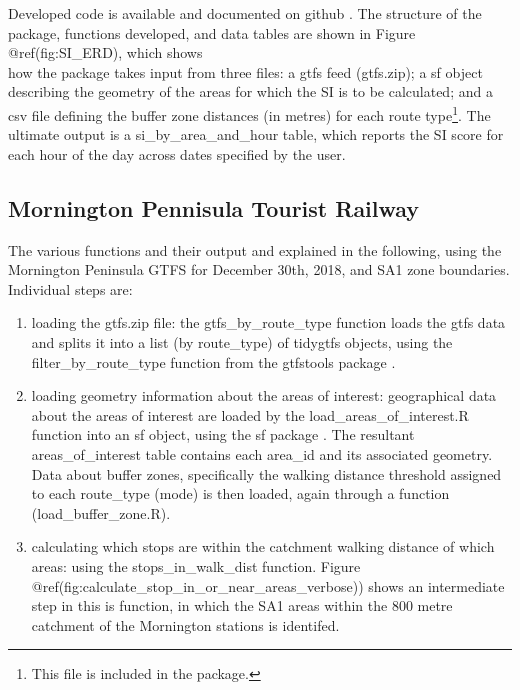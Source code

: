 \documentclass[preprint, 3p,
authoryear]{elsarticle} %
\begin{document}
Developed code is available and documented on github
\citep{gtfssupplyindex_github}. The structure of the package, functions
developed, and data tables are shown in Figure @ref(fig:SI\_ERD), which
shows\\
how the package takes input from three files: a gtfs feed (gtfs.zip); a
sf object describing the geometry of the areas for which the SI is to be
calculated; and a csv file defining the buffer zone distances (in
metres) for each route type\footnote{This file is included in the
  package.}. The ultimate output is a si\_by\_area\_and\_hour table,
which reports the SI score for each hour of the day across dates
specified by the user.

\hypertarget{mornington-pennisula-tourist-railway}{%
\subsection{Mornington Pennisula Tourist
Railway}\label{mornington-pennisula-tourist-railway}}

The various functions and their output and explained in the following,
using the Mornington Peninsula GTFS for December 30th, 2018, and SA1
zone boundaries. Individual steps are:

\begin{enumerate}
\def\labelenumi{(\arabic{enumi})}
\item
  loading the gtfs.zip file: the gtfs\_by\_route\_type function loads
  the gtfs data and splits it into a list (by route\_type) of tidygtfs
  objects, using the filter\_by\_route\_type function from the gtfstools
  package \citep{filter_GTFS_by_mode}.
\item
  loading geometry information about the areas of interest: geographical
  data about the areas of interest are loaded by the
  load\_areas\_of\_interest.R function into an sf object, using the sf
  package \citep{R-sf}. The resultant areas\_of\_interest table contains
  each area\_id and its associated geometry. Data about buffer zones,
  specifically the walking distance threshold assigned to each
  route\_type (mode) is then loaded, again through a function
  (load\_buffer\_zone.R).
\item
  calculating which stops are within the catchment walking distance of
  which areas: using the stops\_in\_walk\_dist function. Figure
  @ref(fig:calculate\_stop\_in\_or\_near\_areas\_verbose)) shows an
  intermediate step in this is function, in which the SA1 areas within
  the 800 metre catchment of the Mornington stations is identifed.
\end{enumerate}
\end{document}
